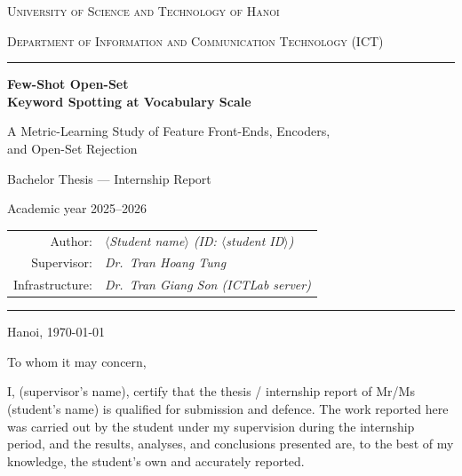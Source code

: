 \documentclass[12pt,a4paper]{article}
\begin{document}
\begin{titlepage}
\centering
\vspace*{0.6cm}
{\scshape\large University of Science and Technology of Hanoi\par}
{\scshape Department of Information and Communication Technology (ICT)\par}
\vspace{0.4cm}
\rule{\linewidth}{0.4pt}
\vfill
{\Huge\bfseries Few-Shot Open-Set\\[6pt] Keyword Spotting at Vocabulary Scale\par}
\vspace{10pt}
{\large A Metric-Learning Study of Feature Front-Ends, Encoders,\\
and Open-Set Rejection\par}
\vfill
{\large Bachelor Thesis --- Internship Report\par}
{\large Academic year 2025--2026\par}
\vspace{0.8cm}
\begin{tabular}{rl}
Author: & \textit{$\langle$Student name$\rangle$ \quad (ID: $\langle$student ID$\rangle$)} \\[3pt]
Supervisor: & \textit{Dr.\ Tran Hoang Tung} \\[3pt]
Infrastructure: & \textit{Dr.\ Tran Giang Son (ICTLab server)} \\
\end{tabular}
\vfill
\rule{\linewidth}{0.4pt}
{\large Hanoi, \today\par}
\end{titlepage}

\newpage
\thispagestyle{empty}
\vspace*{1cm}
\noindent To whom it may concern,
\vspace{0.6cm}

\noindent I, \underline{\hspace{5cm}} (supervisor's name), certify that the
thesis / internship report of Mr/Ms \underline{\hspace{4cm}} (student's name)
is qualified for submission and defence. The work reported here was carried out
by the student under my supervision during the internship period, and the
results, analyses, and conclusions presented are, to the best of my knowledge,
the student's own and accurately reported.
\end{document}
